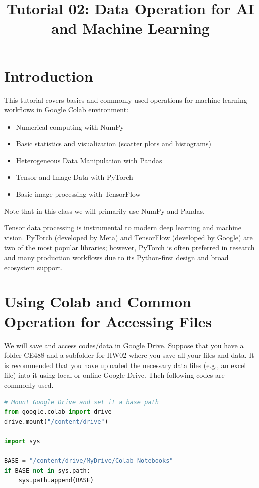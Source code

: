 \documentclass[12pt]{article}
\begin{document}
\title{Tutorial 02:  Data Operation for AI and Machine Learning}
\author{}
\date{}

\maketitle
\doublespacing


\section*{Introduction}
This tutorial covers basics and commonly used operations for machine learning workflows in Google Colab environment:
\begin{itemize}
\item Numerical computing with NumPy
\item Basic statistics and visualization (scatter plots and histograms)
\item Heterogeneous Data Manipulation with Pandas
\item Tensor and Image Data with PyTorch
\item Basic image processing with TensorFlow
\end{itemize}
Note that in this class we will primarily use NumPy and Pandas.

Tensor data processing is instrumental to modern deep learning and machine vision. PyTorch (developed by Meta) and TensorFlow (developed by Google) are two of the most popular libraries; however, PyTorch is often preferred in research and many production workflows due to its Python-first design and broad ecosystem support.

\section{Using Colab and Common Operation for Accessing Files}

We will save and access codes/data in Google Drive. Suppose that you have a folder CE488 and a subfolder for HW02 where you save all your files and data. It is recommended that you have uploaded the necessary data files (e.g., an excel file) into it using local or online Google Drive. Theh following codes are commonly used.

\begin{lstlisting}[numbers=none, language=Python, caption=Common codes for Google Drive Access]
# Mount Google Drive and set it a base path
from google.colab import drive
drive.mount("/content/drive")

import sys

BASE = "/content/drive/MyDrive/Colab Notebooks"
if BASE not in sys.path:
    sys.path.append(BASE)
\end{lstlisting}
\end{document}
